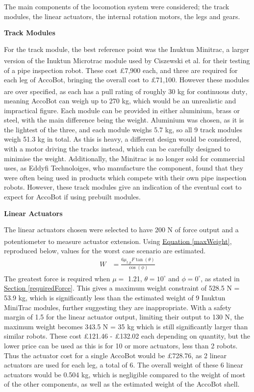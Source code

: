 \documentclass[11pt]{article}		%
\newcommand{\supercite}[1]{\textsuperscript{\cite{#1}}}		%
\newcommand{\equationref}[1]{\hyperref[#1]{Equation \ref*{#1}}}     %
\newcommand{\sectref}[1]{\hyperref[#1]{Section \ref*{#1}}}     %
\begin{document}
			The main components of the locomotion system were considered; the track modules, the linear actuators, the internal rotation motors, the legs and gears.
			
			\textbf{Track Modules}
			
			For the track module, the best reference point was the Inuktun Minitrac, a larger version of the Inuktun Microtrac module used by Ciszewski et al.\supercite{ciszewski2015design} for their testing of a pipe inspection robot.
			These cost £7,900 each, and three are required for each leg of AccoBot, bringing the overall cost to £71,100.
			However these modules are over specified, as each has a pull rating of roughly 30 kg for continuous duty\supercite{inuktunTracks}, meaning AccoBot can weigh up to 270 kg, which would be an unrealistic and impractical figure.
			Each module can be provided in either aluminium, brass or steel, with the main difference being the weight.
			Aluminium was chosen, as it is the lightest of the three, and each module weighs 5.7 kg, so all 9 track modules weigh 51.3 kg in total.
			As this is heavy, a different design would be considered, with a motor driving the tracks instead, which can be carefully designed to minimise the weight.
			Additionally, the Minitrac is no longer sold for commercial uses, as Eddyfi Technoloiges, who manufacture the component, found that they were often being used in products which compete with their own pipe inspection robots.
			However, these track modules give an indication of the eventual cost to expect for AccoBot if using prebuilt modules.
			
			\textbf{Linear Actuators}
			
			The linear actuators chosen were selected to have 200 N of force output and a potentiometer to measure actuator extension\supercite{rsproLinear}.
			Using \equationref{maxWeight}, reproduced below, values for the worst case scenario are estimated.
			\begin{align*}
				W &= \frac{6 \mu_{t,p} F \tan \left( \theta \right)}{\cos \left( \phi \right)}
			\end{align*}
			The greatest force is required when $\mu =$ 1.21\supercite{sato2011development}, $\theta = 10^\circ$ and $\phi = 0^\circ$, as stated in \sectref{requiredForce}.
			This gives a maximum weight constraint of 528.5 N = 53.9 kg, which is significantly less than the estimated weight of 9 Inuktun MiniTrac modules, further suggesting they are inappropriate.
			With a safety margin of 1.5 for the linear actuator output, limiting their output to 130 N, the maximum weight becomes 343.5 N = 35 kg which is still significantly larger than similar robots.
			These cost £121.46 - £132.02 each depending on quantity, but the lower price can be used as this is for 10 or more actuators, less than 2 robots.
			Thus the actuator cost for a single AccoBot would be £728.76, as 2 linear actuators are used for each leg, a total of 6.
			The overall weight of these 6 linear actuators would be 0.504 kg, which is negligible compared to the weight of most of the other components, as well as the estimated weight of the AccoBot shell.
			
\end{document}
